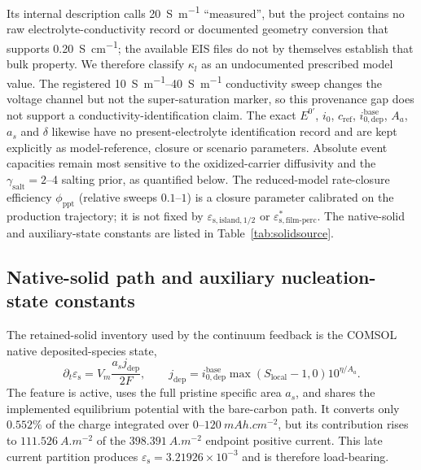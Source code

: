 \documentclass[11pt]{article}
\newcommand{\epss}{\varepsilon_{\mathrm{s}}}
\newcommand{\epsislandhalf}{\varepsilon_{\mathrm{s,island},1/2}}
\newcommand{\epsfilmperc}{\varepsilon_{\mathrm{s,film\text{-}perc}}^{*}}
\begin{document}
Its internal description calls \SI{20}{S.m^{-1}} ``measured'', but the project contains no raw
electrolyte-conductivity record or documented geometry conversion that supports \SI{0.20}{S.cm^{-1}};
the available EIS files do not by themselves establish that bulk property. We therefore classify
$\kappa_l$ as an undocumented prescribed model value. The registered \SIrange{10}{40}{S.m^{-1}}
conductivity sweep changes the voltage channel but not the super-saturation marker, so this provenance gap
does not support a conductivity-identification claim. The exact $E^{0\prime}$, $i_0$, $c_{\mathrm{ref}}$,
$i_{0,\mathrm{dep}}^{\mathrm{base}}$, $A_a$, $a_s$ and $\delta$ likewise have no present-electrolyte
identification record and are kept explicitly as
model-reference, closure or scenario parameters. Absolute event capacities remain most sensitive to the
oxidized-carrier diffusivity and the $\gamma_{\mathrm{salt}}=2$--4 salting prior, as quantified below.
The reduced-model rate-closure efficiency $\phi_{\mathrm{ppt}}$ (relative sweeps $0.1$--$1$) is a
closure parameter calibrated on the production trajectory; it is not fixed by
$\epsislandhalf$ or $\epsfilmperc$. The native-solid and auxiliary-state constants are listed in
Table~\ref{tab:solidsource}.

\subsection{Native-solid path and auxiliary nucleation-state constants}\label{sec:solidsource}
The retained-solid inventory used by the continuum feedback is the COMSOL native deposited-species state,
\begin{equation*}
\partial_t\epss=V_m\frac{a_sj_{\mathrm{dep}}}{2F},\qquad
j_{\mathrm{dep}}=i_{0,\mathrm{dep}}^{\mathrm{base}}\max(S_{\mathrm{local}}-1,0)10^{\eta/A_a}.
\end{equation*}
The feature is active, uses the full pristine specific area $a_s$, and shares the implemented equilibrium
potential with the bare-carbon path. It converts only $0.552\%$ of the charge integrated over
$0$--$120~\si{mAh.cm^{-2}}$, but its contribution rises to $111.526~\si{A.m^{-2}}$ of the
$398.391~\si{A.m^{-2}}$ endpoint positive current. This late current partition produces
$\epss=3.21926\times10^{-3}$ and is therefore load-bearing.
\end{document}
